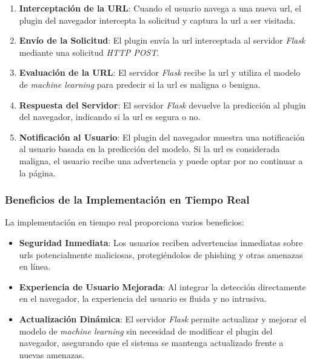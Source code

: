 \begin{enumerate}
    \item \textbf{Interceptación de la URL}: Cuando el usuario navega a una nueva \gls{url}, el \gls{plugin} del navegador intercepta la solicitud y captura la \gls{url} a ser visitada.

    \item \textbf{Envío de la Solicitud}: El \gls{plugin} envía la \gls{url} interceptada al servidor \textit{Flask} mediante una solicitud \textit{HTTP POST}.

    \item \textbf{Evaluación de la URL}: El servidor \textit{Flask} recibe la \gls{url} y utiliza el modelo de \textit{machine learning} para predecir si la \gls{url} es maligna o benigna.

    \item \textbf{Respuesta del Servidor}: El servidor \textit{Flask} devuelve la predicción al \gls{plugin} del navegador, indicando si la \gls{url} es segura o no.

    \item \textbf{Notificación al Usuario}: El \gls{plugin} del navegador muestra una notificación al usuario basada en la predicción del modelo. Si la \gls{url} es considerada maligna, el usuario recibe una advertencia y puede optar por no continuar a la página.
\end{enumerate}

\subsubsection*{Beneficios de la Implementación en Tiempo Real}

La implementación en tiempo real proporciona varios beneficios:

\begin{itemize}
    \item \textbf{Seguridad Inmediata}: Los usuarios reciben advertencias inmediatas sobre \glspl{url} potencialmente maliciosas, protegiéndolos de \gls{phishing} y otras amenazas en línea.

    \item \textbf{Experiencia de Usuario Mejorada}: Al integrar la detección directamente en el navegador, la experiencia del usuario es fluida y no intrusiva.

    \item \textbf{Actualización Dinámica}: El servidor \textit{Flask} permite actualizar y mejorar el modelo de \textit{machine learning} sin necesidad de modificar el \gls{plugin} del navegador, asegurando que el sistema se mantenga actualizado frente a nuevas amenazas.
\end{itemize}